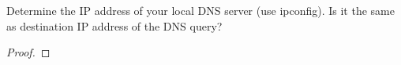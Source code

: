 \documentclass[../../main.tex]{subfiles}
\begin{document}
\begin{wts}
Determine the IP address of your local DNS server (use ipconfig). Is it the same as destination IP address of the DNS query?
\end{wts}
\begin{proof}

\end{proof}
\end{document}
